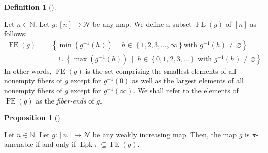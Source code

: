 \documentclass[numbers=enddot,12pt,final,onecolumn,notitlepage]{scrartcl}%
\theoremstyle{definition}
\newtheorem{prop}[theo]{Proposition}
\newenvironment{proposition}[1][]
{\begin{prop}[#1]\begin{leftbar}}
{\end{leftbar}\end{prop}}
\newtheorem{defi}[theo]{Definition}
\newenvironment{definition}[1][]
{\begin{defi}[#1]\begin{leftbar}}
{\end{leftbar}\end{defi}}
\begin{document}
\begin{definition}
\label{def.fiberends}Let $n\in\mathbb{N}$. Let $g:\left[  n\right]
\rightarrow\mathcal{N}$ be any map. We define a subset $\operatorname*{FE}%
\left(  g\right)  $ of $\left[  n\right]  $ as follows:%
\begin{align*}
\operatorname*{FE}\left(  g\right)   &  =\left\{  \min\left(  g^{-1}\left(
h\right)  \right)  \ \mid\ h\in\left\{  1,2,3,\ldots,\infty\right\}  \text{
with }g^{-1}\left(  h\right)  \neq\varnothing\right\} \\
&  \ \ \ \ \ \ \ \ \ \ \cup\left\{  \max\left(  g^{-1}\left(  h\right)
\right)  \ \mid\ h\in\left\{  0,1,2,3,\ldots\right\}  \text{ with }%
g^{-1}\left(  h\right)  \neq\varnothing\right\}  .
\end{align*}
In other words, $\operatorname*{FE}\left(  g\right)  $ is the set comprising
the smallest elements of all nonempty fibers of $g$ except for $g^{-1}\left(
0\right)  $ as well as the largest elements of all nonempty fibers of $g$
except for $g^{-1}\left(  \infty\right)  $. We shall refer to the elements of
$\operatorname*{FE}\left(  g\right)  $ as the \textit{fiber-ends} of $g$.
\end{definition}

\begin{proposition}
\label{prop.Epk.fiberends}Let $n\in\mathbb{N}$. Let $g:\left[  n\right]
\rightarrow\mathcal{N}$ be any weakly increasing map. Then, the map $g$ is
$\pi$-amenable if and only if $\operatorname*{Epk}\pi\subseteq
\operatorname*{FE}\left(  g\right)  $.
\end{proposition}
\end{document}
